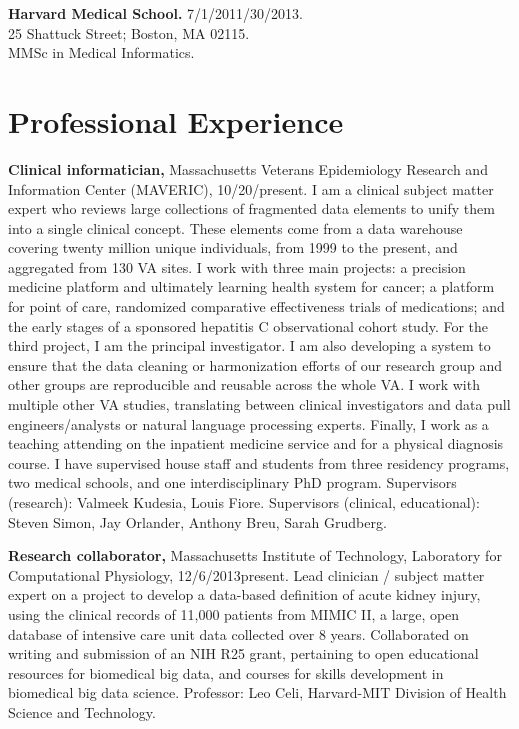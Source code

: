 \documentclass[10pt]{article}
\begin{document}
\textbf{Harvard Medical School.} 7/1/2011/30/2013.\\
25 Shattuck Street; Boston, MA 02115.\\
MMSc in Medical Informatics.

\section*{Professional Experience} %

\textbf{Clinical informatician,} Massachusetts Veterans Epidemiology
Research and Information Center (MAVERIC),
10/20/\ndash{}present. I am a clinical subject matter
expert who reviews large collections of fragmented data elements to
unify them into a single clinical concept. These elements come from a
data warehouse covering twenty million unique individuals, from 1999
to the present, and aggregated from 130 VA sites. I work with three
main projects: a precision medicine platform and ultimately learning
health system for cancer; a platform for point of care, randomized
comparative effectiveness trials of medications; and the early stages
of a sponsored hepatitis C observational cohort study. For the third
project, I am the principal investigator. I am also developing a
system to ensure that the data cleaning or harmonization efforts of
our research group and other groups are reproducible and reusable
across the whole VA. I work with multiple other VA studies,
translating between clinical investigators and data pull
engineers/analysts or natural language processing experts. Finally, I
work as a teaching attending on the inpatient medicine service and for
a physical diagnosis course. I have supervised house staff and
students from three residency programs, two medical schools, and one
interdisciplinary PhD program. Supervisors (research): Valmeek
Kudesia, Louis Fiore. Supervisors (clinical, educational): Steven
Simon, Jay Orlander, Anthony Breu, Sarah Grudberg.

\textbf{Research collaborator,} Massachusetts Institute of Technology,
Laboratory for Computational Physiology, 12/6/2013\ndash{}\linebreak[0]present.
Lead clinician / subject matter expert on a project to develop a
data-based definition of acute kidney injury, using the clinical
records of 11,000 patients from MIMIC II, a large, open database of
intensive care unit data collected over 8 years. Collaborated on
writing and submission of an NIH R25 grant, pertaining to open
educational resources for biomedical big data, and courses for skills
development in biomedical big data science. Professor: Leo Celi,
Harvard-MIT Division of Health Science and Technology.
\end{document}
